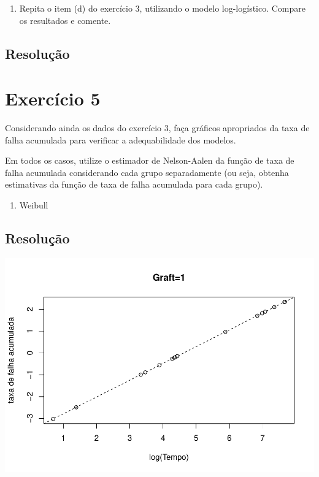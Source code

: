 \documentclass[]{article}
\providecommand{\tightlist}{%
  \setlength{\itemsep}{0pt}\setlength{\parskip}{0pt}}
\begin{document}
\begin{enumerate}
\def\labelenumi{(\alph{enumi})}
\setcounter{enumi}{4}
\tightlist
\item
  Repita o item (d) do exercício 3, utilizando o modelo log-logístico.
  Compare os resultados e comente.
\end{enumerate}

\subsection{Resolução}\label{resolucao-13}

\section{Exercício 5}\label{exercicio-5}

Considerando ainda os dados do exercício 3, faça gráficos apropriados da
taxa de falha acumulada para verificar a adequabilidade dos modelos.

Em todos os casos, utilize o estimador de Nelson-Aalen da função de taxa
de falha acumulada considerando cada grupo separadamente (ou seja,
obtenha estimativas da função de taxa de falha acumulada para cada
grupo).

\begin{enumerate}
\def\labelenumi{(\alph{enumi})}
\tightlist
\item
  Weibull
\end{enumerate}

\subsection{Resolução}\label{resolucao-14}

\begin{center}\includegraphics[width=0.8\linewidth]{Lista_3_files/figure-latex/unnamed-chunk-13-1} \end{center}
\end{document}

